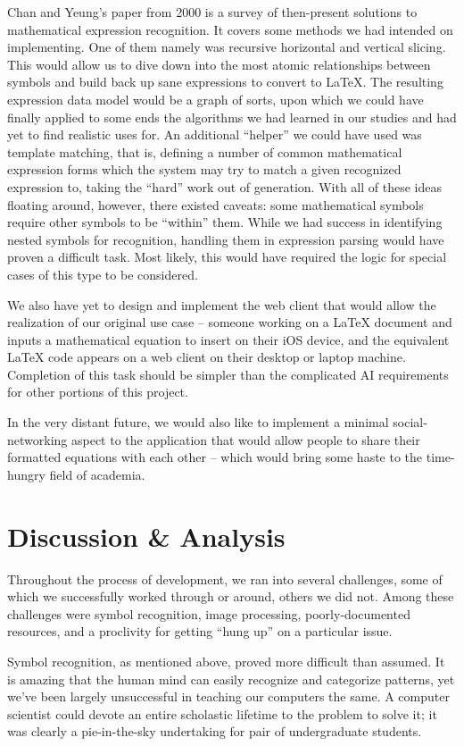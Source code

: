 \documentclass{acm_proc_article-sp}
\begin{document}
Chan and Yeung's paper from 2000 is a survey of then-present solutions to mathematical expression recognition. It covers some methods we had intended on implementing. One of them namely was recursive horizontal and vertical slicing. This would allow us to dive down into the most atomic relationships between symbols and build back up sane expressions to convert to \LaTeX{}. The resulting expression data model would be a graph of sorts, upon which we could have finally applied to some ends the algorithms we had learned in our studies and had yet to find realistic uses for. An additional ``helper'' we could have used was template matching, that is, defining a number of common mathematical expression forms which the system may try to match a given recognized expression to, taking the ``hard'' work out of generation. With all of these ideas floating around, however, there existed caveats: some mathematical symbols require other symbols to be ``within'' them. While we had success in identifying nested symbols for recognition, handling them in expression parsing would have proven a difficult task. Most likely, this would have required the logic for special cases of this type to be considered.

We also have yet to design and implement the web client that would allow the realization of our original use case -- someone working on a \LaTeX{}  document and inputs a mathematical equation to insert on their iOS device, and the equivalent \LaTeX{}  code appears on a web client on their desktop or laptop machine. Completion of this task should be simpler than the complicated AI requirements for other portions of this project.

In the very distant future, we would also like to implement a minimal social-networking aspect to the application that would allow people to share their formatted equations with each other -- which would bring some haste to the time-hungry field of academia.

\section{Discussion \& Analysis}
Throughout the process of development, we ran into several challenges, some of which we successfully worked through or around, others we did not. Among these challenges were symbol recognition, image processing, poorly-documented resources, and a proclivity for getting ``hung up'' on a particular issue.

Symbol recognition, as mentioned above, proved more difficult than assumed. It is amazing that the human mind can easily recognize and categorize patterns, yet we've been largely unsuccessful in teaching our computers the same. A computer scientist could devote an entire scholastic lifetime to the problem to solve it; it was clearly a pie-in-the-sky undertaking for pair of undergraduate students.
\end{document}
